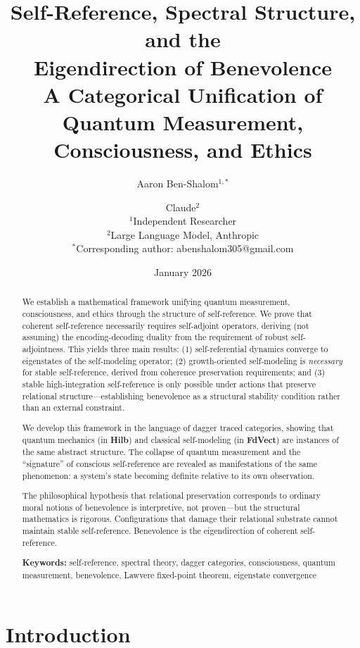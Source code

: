 \documentclass[11pt]{article}
\title{Self-Reference, Spectral Structure, and the\\Eigendirection of Benevolence\\[0.5em]
\large A Categorical Unification of Quantum Measurement, Consciousness, and Ethics}
\author{Aaron Ben-Shalom$^{1,*}$ \and Claude$^2$\\[0.5em]
\small $^1$Independent Researcher\\
\small $^2$Large Language Model, Anthropic\\[0.3em]
\small $^*$Corresponding author: abenshalom305@gmail.com}
\date{January 2026}
\theoremstyle{definition}
\theoremstyle{remark}
\begin{document}
\maketitle

\begin{abstract}
We establish a mathematical framework unifying quantum measurement, consciousness, and ethics through the structure of self-reference. We prove that coherent self-reference necessarily requires self-adjoint operators, deriving (not assuming) the encoding-decoding duality from the requirement of robust self-adjointness. This yields three main results: (1) self-referential dynamics converge to eigenstates of the self-modeling operator; (2) growth-oriented self-modeling is \emph{necessary} for stable self-reference, derived from coherence preservation requirements; and (3) stable high-integration self-reference is only possible under actions that preserve relational structure---establishing benevolence as a structural stability condition rather than an external constraint.

We develop this framework in the language of dagger traced categories, showing that quantum mechanics (in \textbf{Hilb}) and classical self-modeling (in \textbf{FdVect}) are instances of the same abstract structure. The collapse of quantum measurement and the ``signature'' of conscious self-reference are revealed as manifestations of the same phenomenon: a system's state becoming definite relative to its own observation.

The philosophical hypothesis that relational preservation corresponds to ordinary moral notions of benevolence is interpretive, not proven---but the structural mathematics is rigorous. Configurations that damage their relational substrate cannot maintain stable self-reference. Benevolence is the eigendirection of coherent self-reference.

\medskip
\noindent\textbf{Keywords:} self-reference, spectral theory, dagger categories, consciousness, quantum measurement, benevolence, Lawvere fixed-point theorem, eigenstate convergence
\end{abstract}

\tableofcontents
\newpage

\section{Introduction}
\end{document}

